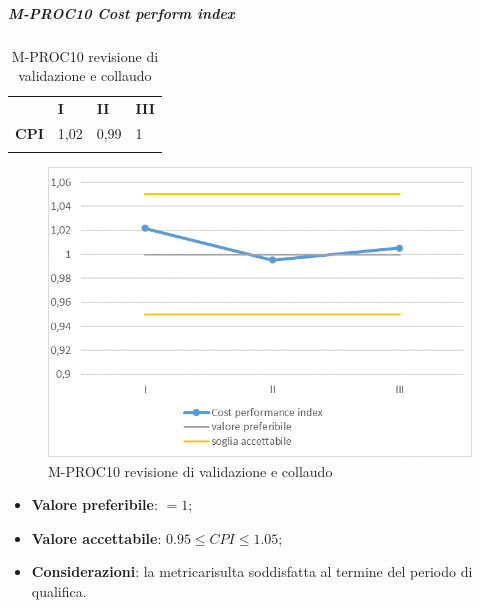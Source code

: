 \subparagraph{M-PROC10 Cost perform index} \mbox{}
\begin{longtable}[H!] {						
		>{}p{50mm}  		
		>{}p{8mm}
		>{}p{8mm}		
		>{}p{8mm}		
	}
	\rowcolor{gray!50}
	\textbf{} & \textbf{I} & \textbf{II} & \textbf{III}  \TBstrut \\ [2mm]
	\textbf{CPI} & 1,02 & 0,99 & 1 \TBstrut \\ [2mm]
	\rowcolor{white}
	\caption{M-PROC10 revisione di validazione e collaudo}
\end{longtable}
\begin{figure}[H] 	
	\includegraphics[width=\linewidth]{./img/grafici/RA10.png}	
	\caption{M-PROC10 revisione di validazione e collaudo}	
\end{figure}
\begin{itemize}
	\item \textbf{Valore preferibile}: $=1$;
	\item \textbf{Valore accettabile}: $0.95 \le CPI \le 1.05$;
	\item \textbf{Considerazioni}: la metrica\glosp risulta soddisfatta al termine del periodo di qualifica.
\end{itemize}

